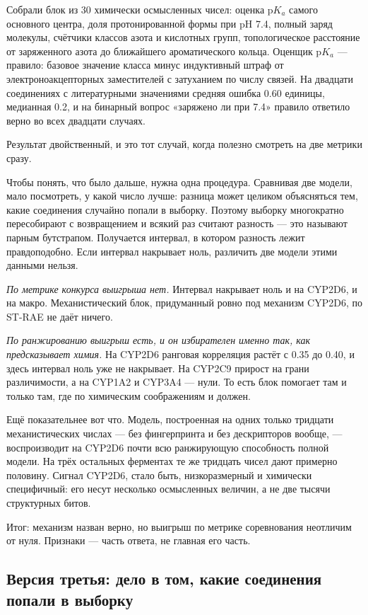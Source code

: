 Собрали блок из 30 химически осмысленных чисел: оценка $\mathrm{p}K_a$ самого основного центра, доля
протонированной формы при pH 7.4, полный заряд молекулы, счётчики классов азота и кислотных групп,
топологическое расстояние от заряженного азота до ближайшего ароматического кольца. Оценщик
$\mathrm{p}K_a$ --- правило: базовое значение класса минус индуктивный штраф от электроноакцепторных
заместителей с затуханием по числу связей. На двадцати соединениях с литературными значениями средняя
ошибка 0.60 единицы, медианная 0.2, и на бинарный вопрос «заряжено ли при 7.4» правило ответило верно
во всех двадцати случаях.

Результат двойственный, и это тот случай, когда полезно смотреть на две метрики сразу.

Чтобы понять, что было дальше, нужна одна процедура. Сравнивая две модели, мало посмотреть,
у какой число лучше: разница может целиком объясняться тем, какие соединения случайно попали
в выборку. Поэтому выборку многократно пересобирают с возвращением и всякий раз считают
разность --- это называют парным бутстрапом. Получается интервал, в котором разность лежит
правдоподобно. Если интервал накрывает ноль, различить две модели этими данными нельзя.

\emph{По метрике конкурса выигрыша нет.} Интервал накрывает ноль и на CYP2D6, и на макро.
Механистический блок, придуманный ровно под механизм CYP2D6, по ST-RAE не даёт ничего.

\emph{По ранжированию выигрыш есть, и он избирателен именно так, как предсказывает химия.}
На CYP2D6 ранговая корреляция растёт с 0.35 до 0.40, и здесь интервал ноль уже не накрывает.
На CYP2C9 прирост на грани различимости, а на CYP1A2 и CYP3A4 --- нули. То есть блок помогает
там и только там, где по химическим соображениям и должен.

Ещё показательнее вот что. Модель, построенная на одних только тридцати механистических
числах --- без фингерпринта и без дескрипторов вообще, --- воспроизводит на CYP2D6 почти всю
ранжирующую способность полной модели. На трёх остальных ферментах те же тридцать чисел дают
примерно половину. Сигнал CYP2D6, стало быть, низкоразмерный и химически специфичный: его
несут несколько осмысленных величин, а не две тысячи структурных битов.

Итог: механизм назван верно, но выигрыш по метрике соревнования неотличим от нуля. Признаки --- часть
ответа, не главная его часть.

\subsection{Версия третья: дело в том, какие соединения попали в выборку}
\label{sec:d6}

